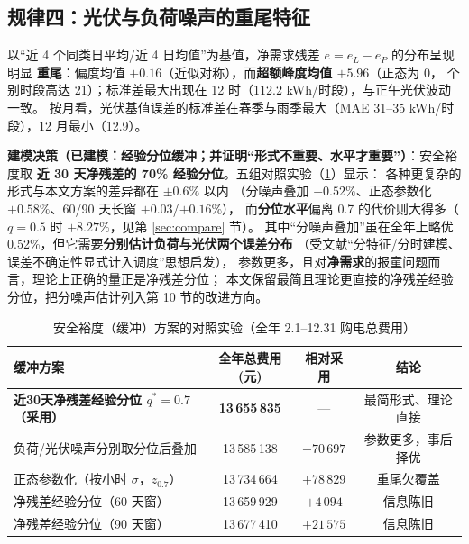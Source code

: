\documentclass[12pt,a4paper,fontset=fandol]{ctexart}
\begin{document}
\subsection{规律四\nobreak：光伏与负荷噪声的重尾特征}

以“近 4 个同类日平均/近 4 日均值\nobreak”为基值\nobreak，净需求残差 $e=e_L-e_P$ 的分布呈现明显
\textbf{重尾}\nobreak：偏度均值 $+0.16$（近似对称\nobreak）\nobreak，而\textbf{超额峰度均值 $+5.96$}（正态为 0\nobreak，
个别时段高达 21\nobreak）\nobreak；标准差最大出现在 12 时（112.2 kWh/时段\nobreak）\nobreak，与正午光伏波动一致\nobreak。
按月看\nobreak，光伏基值误差的标准差在春季与雨季最大（MAE 31--35 kWh/时段\nobreak）\nobreak，12 月最小（12.9\nobreak）\nobreak。

\textbf{建模决策（已建模\nobreak：经验分位缓冲\nobreak；并证明“形式不重要\nobreak、水平才重要\nobreak”\nobreak）}\nobreak：安全裕度取
\textbf{近 30 天净残差的 70\% 经验分位}\nobreak。五组对照实验（\cref{tab:buffer}\nobreak）显示\nobreak：
各种更复杂的形式与本文方案的差异都在 $\pm0.6\text{\%}$ 以内
（分噪声叠加 $-0.52\text{\%}$\nobreak、正态参数化 $+0.58\text{\%}$\nobreak、60/90 天长窗 $+0.03$/$+0.16\text{\%}$\nobreak）\nobreak，
而\textbf{分位水平}偏离 0.7 的代价则大得多（$q=0.5$ 时 $+8.27\text{\%}$\nobreak，见第 \ref{sec:compare} 节\nobreak）\nobreak。
其中“分噪声叠加\nobreak”虽在全年上略优 0.52\%\nobreak，但它需要\textbf{分别估计负荷与光伏两个误差分布}
（受文献\cite{cqut253,cqut276}“分特征/分时建模\nobreak、误差不确定性显式计入调度\nobreak”思想启发\nobreak）\nobreak，
参数更多\nobreak，且对\textbf{净需求}的报童问题而言\nobreak，理论上正确的量正是净残差分位\nobreak；
本文保留最简且理论更直接的净残差经验分位\nobreak，把分噪声估计列入第 10 节的改进方向\nobreak。

\begin{table}[htbp]
\centering
\caption{安全裕度（缓冲\nobreak）方案的对照实验（全年 2.1--12.31 购电总费用\nobreak）}
\label{tab:buffer}
\begin{tabular}{@{}lccc@{}}
\toprule
缓冲方案 & 全年总费用(元) & 相对采用 & 结论 \\
\midrule
\textbf{近30天净残差经验分位 $q^*=0.7$（采用\nobreak）} & \textbf{13\,655\,835} & --- & 最简形式\nobreak、理论直接 \\
负荷/光伏噪声分别取分位后叠加 & 13\,585\,138 & $-70\,697$ & 参数更多\nobreak，事后择优 \\
正态参数化（按小时 $\sigma$\nobreak，$z_{0.7}$\nobreak） & 13\,734\,664 & $+78\,829$ & 重尾欠覆盖 \\
净残差经验分位（60 天窗\nobreak） & 13\,659\,929 & $+4\,094$ & 信息陈旧 \\
净残差经验分位（90 天窗\nobreak） & 13\,677\,410 & $+21\,575$ & 信息陈旧 \\
\bottomrule
\end{tabular}
\end{table}
\end{document}
